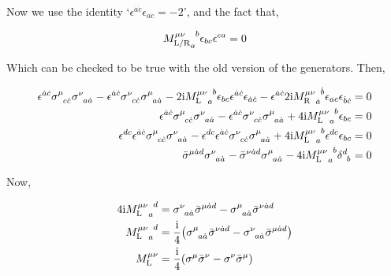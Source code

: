 Now we use the identity `$\epsilon^{\dot a\dot c}\epsilon_{\dot a\dot c}=-2$', and the fact that,

\begin{align}
    \tensor{{M^{\mu\nu}_{\textnormal{L/R}}}}{_a^b}\epsilon_{bc}\epsilon^{ca}=0\nonumber
\end{align}

Which can be checked to be true with the old version of the generators. Then,

\begin{align}
    \epsilon^{\dot a\dot c}\tensor{\sigma}{^\mu_c_{\dot c}}\tensor{\sigma}{^\nu_a_{\dot a}}- \epsilon^{\dot a\dot c}\tensor{\sigma}{^\nu_c_{\dot c}}\tensor{\sigma}{^\mu_a_{\dot a}}-2\im\tensor{{{M_{\textnormal L}^{\mu\nu}}}}{_a^b}\epsilon_{bc}\epsilon^{\dot a\dot c}\epsilon_{\dot a\dot c}-\epsilon^{\dot a\dot c}2\im\tensor{{{M_{\textnormal R}^{\mu\nu}}}}{_{\dot a}^{\dot b}}\epsilon_{ac}\epsilon_{\dot b\dot c}&=0\nonumber\\
    \epsilon^{\dot a\dot c}\tensor{\sigma}{^\mu_c_{\dot c}}\tensor{\sigma}{^\nu_a_{\dot a}}- \epsilon^{\dot a\dot c}\tensor{\sigma}{^\nu_c_{\dot c}}\tensor{\sigma}{^\mu_a_{\dot a}}+4\im\tensor{{{M_{\textnormal L}^{\mu\nu}}}}{_a^b}\epsilon_{bc}&=0\nonumber\\
    \epsilon^{dc}\epsilon^{\dot a\dot c}\tensor{\sigma}{^\mu_c_{\dot c}}\tensor{\sigma}{^\nu_a_{\dot a}}-\epsilon^{dc}\epsilon^{\dot a\dot c}\tensor{\sigma}{^\nu_c_{\dot c}}\tensor{\sigma}{^\mu_a_{\dot a}}+4\im\tensor{{{M_{\textnormal L}^{\mu\nu}}}}{_a^b}\epsilon^{dc}\epsilon_{bc}&=0\nonumber\\
    \tensor{{\bar\sigma}}{^\mu^{\dot a}^d}\tensor{\sigma}{^\nu_a_{\dot a}}-\tensor{{\bar\sigma}}{^\nu^{\dot a}^d}\tensor{\sigma}{^\mu_a_{\dot a}}-4\im\tensor{{{M_{\textnormal L}^{\mu\nu}}}}{_a^b}\tensor{\delta}{^d_b}&=0\nonumber
\end{align}

Now,

\begin{align}
    4\im\tensor{{{M_{\textnormal L}^{\mu\nu}}}}{_a^d}&=\tensor{\sigma}{^\nu_a_{\dot a}}\tensor{{\bar\sigma}}{^\mu^{\dot a}^d}-\tensor{\sigma}{^\mu_a_{\dot a}}\tensor{{\bar\sigma}}{^\nu^{\dot a}^d}\nonumber\\
    \tensor{{{M_{\textnormal L}^{\mu\nu}}}}{_a^d}&=\frac\im 4\qty(\tensor{\sigma}{^\mu_a_{\dot a}}\tensor{{\bar\sigma}}{^\nu^{\dot a}^d}-\tensor{\sigma}{^\nu_a_{\dot a}}\tensor{{\bar\sigma}}{^\mu^{\dot a}^d})\nonumber\\
    M_{\textnormal L}^{\mu\nu}&=\frac\im 4\qty(\tensor{\sigma}{^\mu}\tensor{{\bar\sigma}}{^\nu}-\tensor{\sigma}{^\nu}\tensor{{\bar\sigma}}{^\mu})\nonumber
\end{align}

